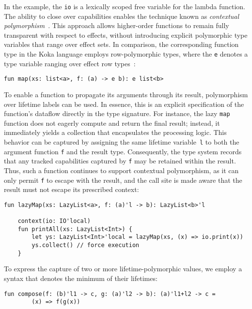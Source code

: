 \documentclass[acmsmall,review,screen]{acmart}
\begin{document}
In the example, the \lstinline[language=colang]|io| is a lexically scoped free variable for the lambda function.
The ability to close over capabilities enables the technique known as \textit{contextual polymorphism}~\cite{brachthauser2020effects, brachthauser2022effects}.
This approach allows higher-order functions to remain fully transparent with respect to effects, without introducing explicit polymorphic type variables that range over effect sets.
In comparison, the corresponding function type in the Koka language employs row-polymorphic types, where the \lstinline[language=colang]|e| denotes a type variable ranging over effect row types~\cite{leijen2014koka}:
\begin{lstlisting}[language=colang]
    fun map(xs: list<a>, f: (a) -> e b): e list<b>
\end{lstlisting}

To enable a function to propagate its arguments through its result, polymorphism over lifetime labels can be used.
In essence, this is an explicit specification of the function’s dataflow directly in the type signature.
For instance, the lazy \lstinline[language=colang]|map| function does not eagerly compute and return the final result; instead, it immediately yields a collection that encapsulates the processing logic.
This behavior can be captured by assigning the same lifetime variable~\lstinline[language=colang]|l| to both the argument function \lstinline[language=colang]|f| and the result type.
Consequently, the type system records that any tracked capabilities captured by \lstinline[language=colang]|f| may be retained within the result.
Thus, such a function continues to support contextual polymorphism, as it can only permit \texttt{f} to escape with the result, and the call site is made aware that the result must not escape its prescribed context:
\begin{lstlisting}[language=colang]
    fun lazyMap(xs: LazyList<a>, f: (a)'l -> b): LazyList<b>'l

    context(io: IO'local)
    fun printAll(xs: LazyList<Int>) {
        let ys: LazyList<Int>'local = lazyMap(xs, (x) => io.print(x))
        ys.collect() // force execution
    }
\end{lstlisting}

To express the capture of two or more lifetime-polymorphic values, we employ a syntax that denotes the minimum of their lifetimes:
\begin{lstlisting}[language=colang]
    fun compose(f: (b)'l1 -> c, g: (a)'l2 -> b): (a)'l1+l2 -> c =
        (x) => f(g(x))
\end{lstlisting}
\end{document}
